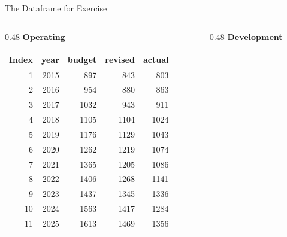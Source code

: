 \documentclass[aspectratio=169,11pt]{beamer}
\begin{document}
	
	\begin{frame}{The Dataframe for Exercise}
	
			\centering
			\scriptsize
			
			\begin{columns}[T]
				
				\begin{column}{0.48\textwidth}
					\centering
					\textbf{Operating}
					
					\vspace{0.2cm}
					
					\begin{tabular}{rrrrr}
						\toprule
						Index & year & budget & revised & actual \\
						\midrule
						1  & 2015 & 897  & 843  & 803  \\
						2  & 2016 & 954  & 880  & 863  \\
						3  & 2017 & 1032 & 943  & 911  \\
						4  & 2018 & 1105 & 1104 & 1024 \\
						5  & 2019 & 1176 & 1129 & 1043 \\
						6  & 2020 & 1262 & 1219 & 1074 \\
						7  & 2021 & 1365 & 1205 & 1086 \\
						8  & 2022 & 1406 & 1268 & 1141 \\
						9  & 2023 & 1437 & 1345 & 1336 \\
						10 & 2024 & 1563 & 1417 & 1284 \\
						11 & 2025 & 1613 & 1469 & 1356 \\
						\bottomrule
					\end{tabular}
					
				\end{column}
				
				\begin{column}{0.48\textwidth}
					\centering
					\textbf{Development}
					
					\vspace{0.2cm}
					

\end{column}
\end{columns}
\end{frame}
\end{document}
